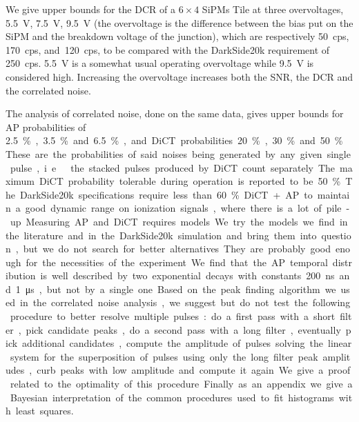 \documentclass[11pt]{article}
\begin{document}
    
    We give upper bounds for the DCR of a $6\times4$ SiPMs Tile at three
    overvoltages, \SI{5.5}{V}, \SI{7.5}{V}, \SI{9.5}{V} (the overvoltage is the
    difference between the bias put on the SiPM and the breakdown voltage of
    the junction), which are respectively \SI{50}{cps}, \SI{170}{cps},
    and~\SI{120}{cps}, to be compared with the DarkSide20k requirement of
    \SI{250}{cps}. \SI{5.5}{V} is a somewhat usual operating overvoltage while
    \SI{9.5}{V} is considered high. Increasing the overvoltage increases both
    the SNR, the DCR and the correlated noise.
    
    The analysis of correlated noise, done on the same data, gives upper bounds
    for AP probabilities of \SI{2.5}\%, \SI{3.5}\% and \SI{6.5}\%, and DiCT
    probabilities \SI{20}\%, \SI{30}\% and~\SI{50}\%. These are the
    probabilities of said noises being generated by any given single pulse,
    i.e.\ the stacked pulses produced by DiCT count separately. The maximum
    DiCT probability tolerable during operation is reported to be \SI{50}\%.
    The DarkSide20k specifications require less than \SI{60}\% DiCT+AP to
    maintain a good dynamic range on ionization signals, where there is a lot
    of pile-up.
    
    Measuring AP and DiCT requires models. We try the models we find in the
    literature and in the DarkSide20k simulation and bring them into question,
    but we do not search for better alternatives. They are probably good enough
    for the necessities of the experiment. We find that the AP temporal
    distribution is well described by two exponential decays with constants
    \SI{200}{ns} and \SI{1}{\micro s}, but not by a single one.
    
    Based on the peak finding algorithm we used in the correlated noise
    analysis, we suggest but do not test the following procedure to better
    resolve multiple pulses: do a first pass with a short filter, pick
    candidate peaks, do a second pass with a long filter, eventually pick
    additional candidates, compute the amplitude of pulses solving the linear
    system for the superposition of pulses using only the long filter peak
    amplitudes, curb peaks with low amplitude and compute it again. We give a
    proof related to the optimality of this procedure.
    
    Finally as an appendix we give a Bayesian interpretation of the common
    procedures used to fit histograms with least squares.
    
\end{document}
